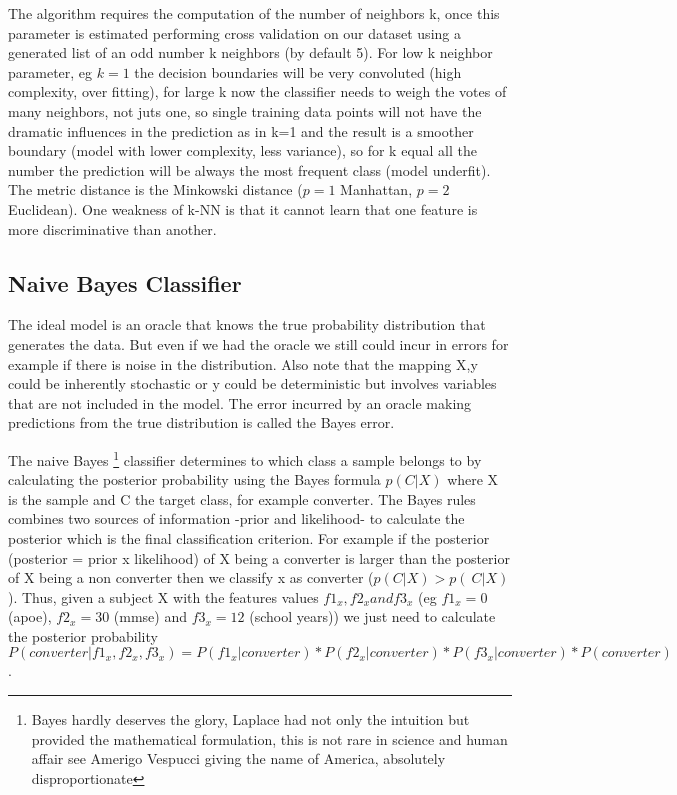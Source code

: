 \documentclass[12pt]{report}
\begin{document}
The algorithm requires the computation of the number of neighbors k, once this parameter is estimated performing cross validation on our dataset using a generated list of an odd number k neighbors (by default 5). For low k neighbor parameter, eg $k=1$ the decision boundaries will be very convoluted (high complexity, over fitting), for large k now the classifier needs to weigh the votes of many neighbors, not juts one, so single training data points will not have the dramatic influences in the prediction as in k=1 and the result is a smoother boundary (model with lower complexity, less variance), so for k equal all the number the prediction will be always the most frequent class (model underfit). The metric distance is the Minkowski distance ($p=1$ Manhattan, $p=2$ Euclidean). 
One weakness of k-NN  is that it cannot learn that one feature is more discriminative than another.

\subsection{Naive Bayes Classifier}
The ideal model is an oracle that knows the true probability distribution that generates the data. But even if we had the oracle we still could incur in errors for example if there is noise in the distribution.
Also note that the mapping X,y could be inherently stochastic  or y could be deterministic but involves variables that are not included in the model. The error incurred by an oracle making predictions from the true distribution is called the Bayes error.

The naive Bayes \footnote{Bayes hardly deserves the glory, Laplace had not only the intuition but provided the mathematical formulation, this is not rare in science and human affair see Amerigo Vespucci giving the name of America, absolutely disproportionate} classifier determines to which class a sample belongs to by calculating the posterior probability using the Bayes formula $p(C|X)$ where X is the sample and C the target class, for example converter.
The Bayes rules combines two sources of information -prior and likelihood- to calculate the posterior which is the final classification criterion.
For example if the posterior (posterior = prior x likelihood) of X being a converter is larger than the posterior of X being a non converter then we classify x as converter ($p(C|X) > p(~C|X)$). Thus, given a subject X with the features values $f1_x, f2_x and f3_x$ (eg $f1_x=0$ (apoe), $f2_x=30$ (mmse) and $f3_x=12$ (school years)) we just need to calculate 
the posterior probability $P(converter|f1_x, f2_x, f3_x) = P(f1_x|converter) * P(f2_x|converter) * P(f3_x|converter) * P(converter)$.
\end{document}
